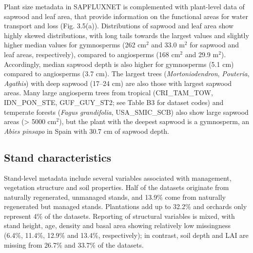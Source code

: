 \documentclass[11pt,twoside]{reedthesis}
\begin{document}
Plant size metadata in SAPFLUXNET is complemented with plant-level data
of sapwood and leaf area, that provide information on the functional
areas for water transport and loss (Fig. 3.5(a)). Distributions of
sapwood and leaf area show highly skewed distributions, with long tails
towards the largest values and slightly higher median values for
gymnosperms (262 \(\text{cm}^2\) and 33.0 \(\text{m}^2\) for sapwood and
leaf areas, respectively), compared to angiosperms (168 \(\text{cm}^2\)
and 29.9 \(\text{m}^2\)). Accordingly, median sapwood depth is also
higher for gymnosperms (5.1 cm) compared to angiosperms (3.7 cm). The
largest trees (\emph{Mortoniodendron}, \emph{Pouteria}, \emph{Agathis})
with deep sapwood (17--24 cm) are also those with largest sapwood areas.
Many large angiosperm trees from tropical (CRI\_TAM\_TOW, IDN\_PON\_STE,
GUF\_GUY\_ST2; see Table B3 for dataset codes) and temperate forests
(\emph{Fagus grandifolia}, USA\_SMIC\_SCB) also show large sapwood areas
(\textgreater{} 5000 \(\text{cm}^2\)), but the plant with the deepest
sapwood is a gymnosperm, an \emph{Abies pinsapo} in Spain with 30.7 cm
of sapwood depth.\par

\subsection{Stand characteristics}\label{stand-characteristics}

Stand-level metadata include several variables associated with
management, vegetation structure and soil properties. Half of the
datasets originate from naturally regenerated, unmanaged stands, and
13.9\% come from naturally regenerated but managed stands. Plantations
add up to 32.2\% and orchards only represent 4\% of the datasets.
Reporting of structural variables is mixed, with stand height, age,
density and basal area showing relatively low missingness (6.4\%,
11.4\%, 12.9\% and 13.4\%, respectively); in contrast, soil depth and
LAI are missing from 26.7\% and 33.7\% of the datasets.\par
\end{document}
